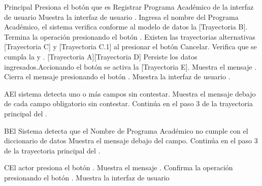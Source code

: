 \begin{UCtrayectoria}{Principal}
    \UCpaso[\UCactor] Presiona el botón \IUbutton{(+)} que es Registrar Programa Académico de la interfaz de usuario 
    \UCpaso Muestra la interfaz de usuario .
    \UCpaso[\UCactor] Ingresa el nombre del Programa Académico, el sistema verifica conforme al modelo de datos la [Trayectoria B].
    \UCpaso[\UCactor] Termina la operación presionando el botón . Existen las trayectorias alternativas [Trayectoria C] y [Trayectoria C.1] al presionar el botón Cancelar.
    \UCpaso Verifica que se cumpla la  y . [Trayectoria A][Trayectoria D]
    \UCpaso Persiste los datos ingresados.Accionando el botón  se activa la  [Trayectoria E].
    \UCpaso Muestra el mensaje .
    \UCpaso[\UCactor] Cierra el mensaje presionando el botón .
    \UCpaso Muestra la interfaz de usuario .
\end{UCtrayectoria}


\begin{UCtrayectoriaA}{A}{El sistema detecta uno o más campos sin contestar.}
    \UCpaso Muestra el mensaje  debajo de cada campo obligatorio sin contestar.
    \UCpaso Continúa en el paso 3 de la trayectoria principal del .
\end{UCtrayectoriaA}


\begin{UCtrayectoriaA}{B}{El Sistema detecta que el Nombre de Programa Académico no cumple con el diccionario de datos}
    \UCpaso Muestra el mensaje  debajo del campo.
    \UCpaso Continúa en el paso 3 de la trayectoria principal del .
\end{UCtrayectoriaA}
\begin{UCtrayectoriaA}{C}{El actor presiona el botón .}
    \UCpaso Muestra el mensaje .
    \UCpaso[\UCactor] Confirma la operación presionando el botón .
    \UCpaso Muestra la interfaz de usuario 
\end{UCtrayectoriaA}

